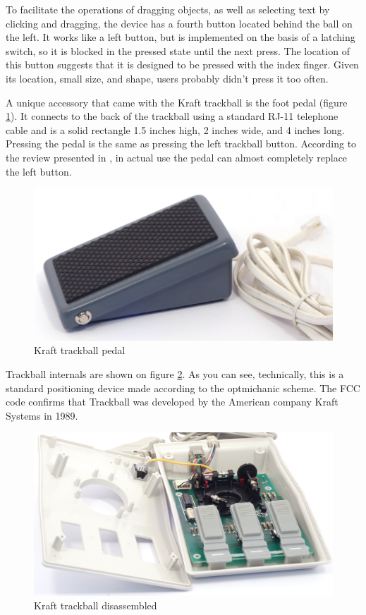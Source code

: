 \documentclass[11pt, a4paper]{article}
\begin{document}
To facilitate the operations of dragging objects, as well as selecting text by clicking and dragging, the device has a fourth button located behind the ball on the left. It works like a left button, but is implemented on the basis of a latching switch, so it is blocked in the pressed state until the next press. The location of this button suggests that it is designed to be pressed with the index finger. Given its location, small size, and shape, users probably didn't press it too often.

A unique accessory that came with the Kraft trackball is the foot pedal (figure \ref{fig:KraftPedal}). It connects to the back of the trackball using a standard RJ-11 telephone cable and is a solid rectangle 1.5 inches high, 2 inches wide, and 4 inches long. Pressing the pedal is the same as pressing the left trackball button. According to the review presented in \cite{kraftwithpedal}, in actual use the pedal can almost completely replace the left button.

\begin{figure}[h]
    \centering
    \includegraphics[scale=0.4]{1990_kraft_toptrack/pedal_30.jpg}
    \caption{Kraft trackball pedal}
    \label{fig:KraftPedal}
\end{figure}

Trackball internals are shown on figure \ref{fig:KraftInside}. As you can see, technically, this is a standard positioning device made according to the optmichanic scheme. The FCC code confirms that Trackball was developed by the American company Kraft Systems in 1989.

\begin{figure}[h]
    \centering
    \includegraphics[scale=0.6]{1989_kraft_trackball/inside_30.jpg}
    \caption{Kraft trackball disassembled}
    \label{fig:KraftInside}
\end{figure}
\end{document}
